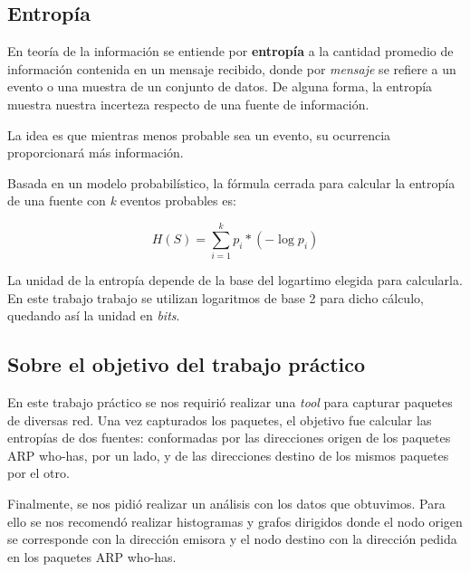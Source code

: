 \subsection{Entropía}

En teoría de la información se entiende por \textbf{entropía} a la cantidad promedio de información contenida en un mensaje recibido, donde por \textit{mensaje} se refiere a un evento o una muestra de un conjunto de datos. De alguna forma, la entropía muestra nuestra incerteza respecto de una fuente de información.\newline

La idea es que mientras menos probable sea un evento, su ocurrencia proporcionará más información.\newline

Basada en un modelo probabilístico, la fórmula cerrada para calcular la entropía de una fuente con \textit{k} eventos probables es:

$$H(S) = \sum \limits_{i=1}^k p_i * (- \log{p_i})$$\newline

La unidad de la entropía depende de la base del logartimo elegida para calcularla. En este trabajo trabajo se utilizan logaritmos de base 2 para dicho cálculo, quedando así la unidad en \textit{bits}.\newline

\subsection{Sobre el objetivo del trabajo práctico}

En este trabajo práctico se nos requirió realizar una \textit{tool} para capturar paquetes de diversas red. Una vez capturados los paquetes, el objetivo fue calcular las entropías de dos fuentes: conformadas por las direcciones origen de los paquetes ARP who-has, por un lado, y de las direcciones destino de los mismos paquetes por el otro.\newline

Finalmente, se nos pidió realizar un análisis con los datos que obtuvimos. Para ello se nos recomendó realizar histogramas y grafos dirigidos donde el nodo origen se corresponde con la dirección emisora y el nodo destino con la dirección pedida en los paquetes ARP who-has.
